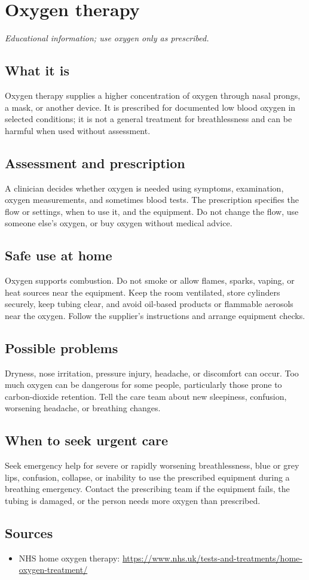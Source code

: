 \chapter{Oxygen therapy}

\medskip
\noindent\textit{Educational information; use oxygen only as prescribed.}

\section*{What it is}
Oxygen therapy supplies a higher concentration of oxygen through nasal prongs, a mask, or another device. It is prescribed for documented low blood oxygen in selected conditions; it is not a general treatment for breathlessness and can be harmful when used without assessment.

\section*{Assessment and prescription}
A clinician decides whether oxygen is needed using symptoms, examination, oxygen measurements, and sometimes blood tests. The prescription specifies the flow or settings, when to use it, and the equipment. Do not change the flow, use someone else’s oxygen, or buy oxygen without medical advice.

\section*{Safe use at home}
Oxygen supports combustion. Do not smoke or allow flames, sparks, vaping, or heat sources near the equipment. Keep the room ventilated, store cylinders securely, keep tubing clear, and avoid oil-based products or flammable aerosols near the oxygen. Follow the supplier’s instructions and arrange equipment checks.

\section*{Possible problems}
Dryness, nose irritation, pressure injury, headache, or discomfort can occur. Too much oxygen can be dangerous for some people, particularly those prone to carbon-dioxide retention. Tell the care team about new sleepiness, confusion, worsening headache, or breathing changes.

\section*{When to seek urgent care}
Seek emergency help for severe or rapidly worsening breathlessness, blue or grey lips, confusion, collapse, or inability to use the prescribed equipment during a breathing emergency. Contact the prescribing team if the equipment fails, the tubing is damaged, or the person needs more oxygen than prescribed.

\section*{Sources}
\begin{itemize}
\item NHS home oxygen therapy: \url{https://www.nhs.uk/tests-and-treatments/home-oxygen-treatment/}
\end{itemize}
